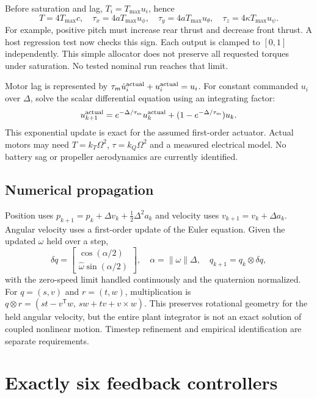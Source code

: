 Before saturation and lag, $T_i=T_{\max}u_i$, hence
\begin{equation}
T=4T_{\max}c,\quad\tau_x=4aT_{\max}u_\phi,\quad
\tau_y=4aT_{\max}u_\theta,\quad\tau_z=4\kappa T_{\max}u_\psi.
\end{equation}
For example, positive pitch must increase rear thrust and decrease front
thrust. A host regression test now checks this sign. Each output is clamped to
$[0,1]$ independently. This simple allocator does not preserve all requested
torques under saturation. No tested nominal run reaches that limit.

Motor lag is represented by $\tau_m\dot u_i^{\rm actual}+u_i^{\rm actual}=u_i$.
For constant commanded $u_i$ over $\Delta$, solve the scalar differential
equation using an integrating factor:
\begin{equation}
u^{\rm actual}_{k+1}=e^{-\Delta/\tau_m}u^{\rm actual}_k
 +(1-e^{-\Delta/\tau_m})u_k.
\end{equation}
This exponential update is exact for the assumed first-order actuator. Actual
motors may need $T=k_T\Omega^2$, $\tau=k_Q\Omega^2$ and a measured electrical
model. No battery sag or propeller aerodynamics are currently identified.

\section{Numerical propagation}
Position uses $p_{k+1}=p_k+\Delta v_k+\tfrac12\Delta^2a_k$ and velocity uses
$v_{k+1}=v_k+\Delta a_k$. Angular velocity uses a first-order update of the
Euler equation. Given the updated $\omega$ held over a step,
\begin{equation}
\delta q=\begin{bmatrix}\cos(\alpha/2)\\
\hat\omega\sin(\alpha/2)\end{bmatrix},\quad
\alpha=\|\omega\|\Delta,\quad q_{k+1}=q_k\otimes\delta q,
\end{equation}
with the zero-speed limit handled continuously and the quaternion normalized.
For $q=(s,v)$ and $r=(t,w)$, multiplication is
$q\otimes r=(st-v^{\mathsf T}w,\,sw+tv+v\times w)$.
This preserves rotational geometry for the held angular velocity, but the
entire plant integrator is not an exact solution of coupled nonlinear motion.
Timestep refinement and empirical identification are separate requirements.

\chapter{Exactly six feedback controllers}
